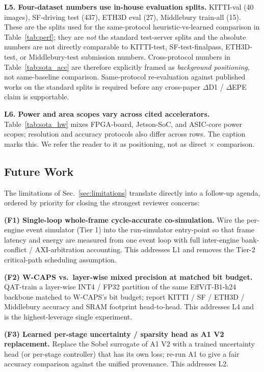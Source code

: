 \documentclass[journal]{IEEEtran}
\begin{document}
\textbf{L5. Four-dataset numbers use in-house evaluation splits.}
KITTI-val (40 images), SF-driving test (437), ETH3D eval (27), Middlebury train-all (15). These are the splits used for the same-protocol heuristic-vs-learned comparison in Table~\ref{tab:perf}; they are \emph{not} the standard test-server splits and the absolute numbers are not directly comparable to KITTI-test, SF-test-finalpass, ETH3D-test, or Middlebury-test submission numbers. Cross-protocol numbers in Table~\ref{tab:sota_acc} are therefore explicitly framed as \emph{background positioning}, not same-baseline comparison. Same-protocol re-evaluation against published works on the standard splits is required before any cross-paper $\Delta$D1 / $\Delta$EPE claim is supportable.

\textbf{L6. Power and area scopes vary across cited accelerators.}
Table~\ref{tab:sota_hw} mixes FPGA-board, Jetson-SoC, and ASIC-core power scopes; resolution and accuracy protocols also differ across rows. The caption marks this. We refer the reader to it as positioning, not as direct $\times$ comparison.

\subsection{Future Work}
\label{sec:future}
The limitations of Sec.~\ref{sec:limitations} translate directly into a follow-up agenda, ordered by priority for closing the strongest reviewer concerns:

\textbf{(F1) Single-loop whole-frame cycle-accurate co-simulation.}
Wire the per-engine event simulator (Tier 1) into the run-simulator entry-point so that frame latency and energy are measured from one event loop with full inter-engine bank-conflict / AXI-arbitration accounting. This addresses L1 and removes the Tier-2 critical-path scheduling assumption.

\textbf{(F2) W-CAPS vs.\ layer-wise mixed precision at matched bit budget.}
QAT-train a layer-wise INT4 / FP32 partition of the same EffViT-B1-h24 backbone matched to W-CAPS's bit budget; report KITTI / SF / ETH3D / Middlebury accuracy and SRAM footprint head-to-head. This addresses L4 and is the highest-leverage single experiment.

\textbf{(F3) Learned per-stage uncertainty / sparsity head as A1 V2 replacement.}
Replace the Sobel surrogate of A1 V2 with a trained uncertainty head (or per-stage controller) that has its own loss; re-run A1 to give a fair accuracy comparison against the unified provenance. This addresses L2.
\end{document}
